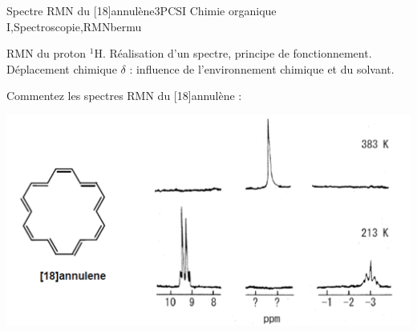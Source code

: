 
\begin{exercise}{Spectre RMN du [18]annulène}{3}{PCSI}
{Chimie organique I,Spectroscopie,RMN}{bermu}

\begin{questions}
\questioncours RMN du proton $^{1}$H. Réalisation d'un spectre, principe de fonctionnement. Déplacement chimique $\delta$ : influence de l'environnement chimique et du solvant.

\question Commentez les spectres RMN du [18]annulène :
\end{questions}

\noindent\includegraphics[width=\linewidth]{chimiePC/orga/annulene.png}

\end{exercise}